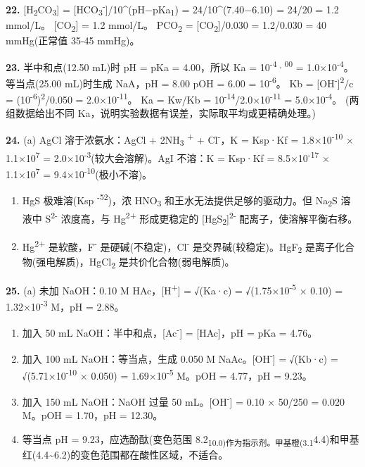 \textbf{22.} {[}H\textsubscript{2}CO\textsubscript{3}{]} = {[}HCO\textsubscript{3}\textsuperscript{-}{]}/10\^{}(pH−pKa\textsubscript{1}) = 24/10\^{}(7.40−6.10) = 24/20 = 1.2 mmol/L。
{[}CO\textsubscript{2}{]} = 1.2 mmol/L。
PCO\textsubscript{2} = {[}CO\textsubscript{2}{]}/0.030 = 1.2/0.030 = 40 mmHg(正常值 35-45 mmHg)。

\textbf{23.} 半中和点(12.50 mL)时 pH = pKa = 4.00，所以 Ka = 10\textsuperscript{-4}·\textsuperscript{00} = 1.0×10\textsuperscript{-4}。
等当点(25.00 mL)时生成 NaA，pH = 8.00 \箭 pOH = 6.00 \箭 [OH^-^] = 10\textsuperscript{-6}。
Kb = {[}OH\textsuperscript{-}{]}\textsuperscript{2}/c = (10\textsuperscript{-6})\textsuperscript{2}/0.050 = 2.0×10\textsuperscript{-11}。
Ka = Kw/Kb = 10\textsuperscript{-14}/2.0×10\textsuperscript{-11} = 5.0×10\textsuperscript{-4}。
(两组数据给出不同 Ka，说明实验数据有误差，实际取平均或更精确处理。)

\textbf{24.}
(a) AgCl 溶于浓氨水：AgCl + 2NH\textsubscript{3} \箭 [Ag(NH~3~)~2~]\textsuperscript{+} + Cl\textsuperscript{-}，K = Ksp·Kf = 1.8×10\textsuperscript{-10} × 1.1×10\textsuperscript{7} = 2.0×10\textsuperscript{-3}(较大会溶解)。AgI 不溶：K = Ksp·Kf = 8.5×10\textsuperscript{-17} × 1.1×10\textsuperscript{7} = 9.4×10\textsuperscript{-10}(极小不溶)。

\begin{enumerate}
\def\labelenumi{(\alph{enumi})}
\setcounter{enumi}{1}
\item
  HgS 极难溶(Ksp \textsuperscript{-52})，浓 HNO\textsubscript{3} 和王水无法提供足够的驱动力。但 Na\textsubscript{2}S 溶液中 S\textsuperscript{2-} 浓度高，与 Hg\textsuperscript{2+} 形成更稳定的 {[}HgS\textsubscript{2}{]}\textsuperscript{2-} 配离子，使溶解平衡右移。
\item
  Hg\textsuperscript{2+} 是软酸，F\textsuperscript{-} 是硬碱(不稳定)，Cl\textsuperscript{-} 是交界碱(较稳定)。HgF\textsubscript{2} 是离子化合物(强电解质)，HgCl\textsubscript{2} 是共价化合物(弱电解质)。
\end{enumerate}

\textbf{25.}
(a) 未加 NaOH：0.10 M HAc，{[}H\textsuperscript{+}{]} = √(Ka·c) = √(1.75×10\textsuperscript{-5} × 0.10) = 1.32×10\textsuperscript{-3} M，pH = 2.88。

\begin{enumerate}
\def\labelenumi{(\alph{enumi})}
\setcounter{enumi}{1}
\item
  加入 50 mL NaOH：半中和点，{[}Ac\textsuperscript{-}{]} = {[}HAc{]}，pH = pKa = 4.76。
\item
  加入 100 mL NaOH：等当点，生成 0.050 M NaAc。{[}OH\textsuperscript{-}{]} = √(Kb·c) = √(5.71×10\textsuperscript{-10} × 0.050) = 1.69×10\textsuperscript{-5} M。pOH = 4.77，pH = 9.23。
\item
  加入 150 mL NaOH：NaOH 过量 50 mL。{[}OH\textsuperscript{-}{]} = 0.10 × 50/250 = 0.020 M。pOH = 1.70，pH = 12.30。
\item
  等当点 pH = 9.23，应选酚酞(变色范围 8.2\textsubscript{10.0)作为指示剂。甲基橙(3.1}4.4)和甲基红(4.4\textasciitilde6.2)的变色范围都在酸性区域，不适合。
\end{enumerate}
